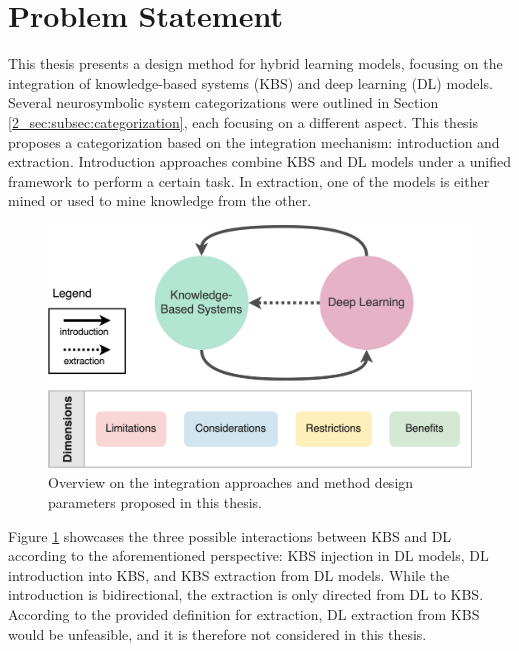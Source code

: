 \section{Problem Statement} \label{3_sec:problem_statement}
This thesis presents a design method for hybrid learning models, focusing on the integration of knowledge-based systems (KBS) and deep learning (DL) models. Several neurosymbolic system categorizations were outlined in Section \ref{2_sec:subsec:categorization}, each focusing on a different aspect. This thesis proposes a categorization based on the integration mechanism: introduction and extraction. Introduction approaches combine KBS and DL models under a unified framework to perform a certain task. In extraction, one of the models is either mined or used to mine knowledge from the other. 

\begin{figure}[t]
    \centering
    \includegraphics[width=.9\linewidth]{3_objectives/figures/overview_method.eps}
    \caption{Overview on the integration approaches and method design parameters proposed in this thesis.}
    \label{fig:thesis_overview}
\end{figure}

Figure \ref{fig:thesis_overview} showcases the three possible interactions between KBS and DL according to the aforementioned perspective: KBS injection in DL models, DL introduction into KBS, and KBS extraction from DL models. While the introduction is bidirectional, the extraction is only directed from DL to KBS. According to the provided definition for extraction, DL extraction from KBS would be unfeasible, and it is therefore not considered in this thesis. 

